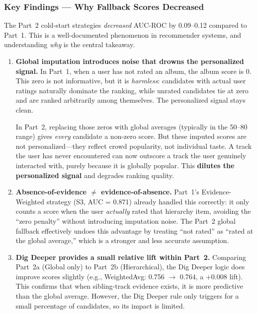 \documentclass[12pt]{article}
\begin{document}
\subsubsection{Key Findings --- Why Fallback Scores Decreased}

The Part~2 cold-start strategies \emph{decreased} AUC-ROC by 0.09--0.12 compared to Part~1. This is a well-documented phenomenon in recommender systems, and understanding \emph{why} is the central takeaway.

\begin{enumerate}
	\item \textbf{Global imputation introduces noise that drowns the personalized signal.}
	In Part~1, when a user has not rated an album, the album score is 0. This zero is not informative, but it is \emph{harmless}: candidates with actual user ratings naturally dominate the ranking, while unrated candidates tie at zero and are ranked arbitrarily among themselves. The personalized signal stays clean.

	In Part~2, replacing those zeros with global averages (typically in the 50--80 range) gives \emph{every} candidate a non-zero score. But these imputed scores are not personalized---they reflect crowd popularity, not individual taste. A track the user has never encountered can now outscore a track the user genuinely interacted with, purely because it is globally popular. This \textbf{dilutes the personalized signal} and degrades ranking quality.

	\item \textbf{Absence-of-evidence $\neq$ evidence-of-absence.}
	Part~1's Evidence-Weighted strategy (S3, AUC = 0.871) already handled this correctly: it only counts a score when the user \emph{actually} rated that hierarchy item, avoiding the ``zero penalty'' without introducing imputation noise. The Part~2 global fallback effectively undoes this advantage by treating ``not rated'' as ``rated at the global average,'' which is a stronger and less accurate assumption.

	\newpage
	\item \textbf{Dig Deeper provides a small relative lift within Part~2.}
	Comparing Part~2a (Global only) to Part~2b (Hierarchical), the Dig Deeper logic does improve scores slightly (e.g., WeightedAvg: 0.756 $\rightarrow$ 0.764, a +0.008 lift). This confirms that when sibling-track evidence exists, it is more predictive than the global average. However, the Dig Deeper rule only triggers for a small percentage of candidates, so its impact is limited.


\end{enumerate}
\end{document}

